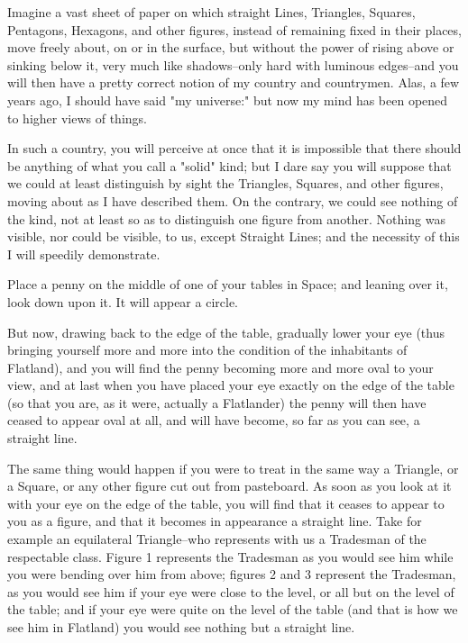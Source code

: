\documentclass[edeposit,fullpage]{uiucthesis2009}
\begin{document}
Imagine a vast sheet of paper on which straight Lines, Triangles,
Squares, Pentagons, Hexagons, and other figures, instead of remaining
fixed in their places, move freely about, on or in the surface, but
without the power of rising above or sinking below it, very much like
shadows--only hard with luminous edges--and you will then have a pretty
correct notion of my country and countrymen.  Alas, a few years ago, I
should have said "my universe:"  but now my mind has been opened to
higher views of things.

In such a country, you will perceive at once that it is impossible that
there should be anything of what you call a "solid" kind; but I dare
say you will suppose that we could at least distinguish by sight the
Triangles, Squares, and other figures, moving about as I have described
them.  On the contrary, we could see nothing of the kind, not at least
so as to distinguish one figure from another.  Nothing was visible, nor
could be visible, to us, except Straight Lines; and the necessity of
this I will speedily demonstrate.

Place a penny on the middle of one of your tables in Space; and leaning
over it, look down upon it.  It will appear a circle.

But now, drawing back to the edge of the table, gradually lower your
eye (thus bringing yourself more and more into the condition of the
inhabitants of Flatland), and you will find the penny becoming more and
more oval to your view, and at last when you have placed your eye
exactly on the edge of the table (so that you are, as it were, actually
a Flatlander) the penny will then have ceased to appear oval at all,
and will have become, so far as you can see, a straight line.

The same thing would happen if you were to treat in the same way a
Triangle, or a Square, or any other figure cut out from pasteboard.  As
soon as you look at it with your eye on the edge of the table, you will
find that it ceases to appear to you as a figure, and that it becomes
in appearance a straight line.  Take for example an equilateral
Triangle--who represents with us a Tradesman of the respectable class.
Figure 1 represents the Tradesman as you would see him while you were
bending over him from above; figures 2 and 3 represent the Tradesman,
as you would see him if your eye were close to the level, or all but on
the level of the table; and if your eye were quite on the level of the
table (and that is how we see him in Flatland) you would see nothing
but a straight line.
\end{document}
